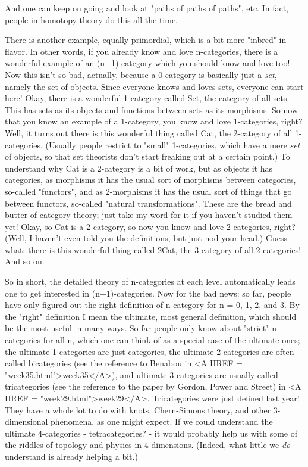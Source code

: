 $$
    

And one can keep on going and look at "paths of paths of paths", etc.
In fact, people in homotopy theory do this all the time.  

There is another example, equally primordial, which is a bit more
"inbred" in flavor.  In other words, if you already know and love
n-categories, there is a wonderful example of an (n+1)-category which
you should know and love too!  Now this isn't so bad, actually,
because a 0-category is basically just a \emph{set}, namely the set of
objects.  Since everyone knows and loves sets, everyone can start
here!  Okay, there is a wonderful 1-category called Set, the category
of all sets.  This has sets as its objects and functions between sets
as its morphisms.  So now that you know an example of a 1-category,
you know and love 1-categories, right?  Well, it turns out there is
this wonderful thing called Cat, the 2-category of all 1-categories.
(Usually people restrict to "small" 1-categories, which have a mere
\emph{set} of objects, so that set theorists don't start freaking out at a
certain point.)  To understand why Cat is a 2-category is a bit of
work, but as objects it has categories, as morphisms it has the usual
sort of morphisms between categories, so-called "functors", and as
2-morphisms it has the usual sort of things that go between functors,
so-called "natural transformations".  These are the bread and butter
of category theory; just take my word for it if you haven't studied
them yet!  Okay, so Cat is a 2-category, so now you know and love
2-categories, right?  (Well, I haven't even told you the definitions,
but just nod your head.)  Guess what: there is this wonderful thing
called 2Cat, the 3-category of all 2-categories!  And so on.

So in short, the detailed theory of n-categories at each level
automatically leads one to get interested in (n+1)-categories.  Now
for the bad news: so far, people have only figured out the right
definition of n-category for n = 0, 1, 2, and 3.  By the "right"
definition I mean the ultimate, most general definition, which should
be the most useful in many ways.  So far people only know about
"strict" n-categories for all n, which one can think of as a special
case of the ultimate ones; the ultimate 1-categories are just
categories, the ultimate 2-categories are often called bicategories
(see the reference to Benabou in <A HREF = "week35.html">week35</A>), and ultimate 3-categories
are usually called tricategories (see the reference to the paper by
Gordon, Power and Street) in <A HREF = "week29.html">week29</A>.  Tricategories were just defined
last year!  They have a whole lot to do with knots, Chern-Simons
theory, and other 3-dimensional phenomena, as one might expect.  If we
could understand the ultimate 4-categories - tetracategories? - it
would probably help us with some of the riddles of topology and
physics in 4 dimensions.  (Indeed, what little we \emph{do} understand
is already helping a bit.)  

